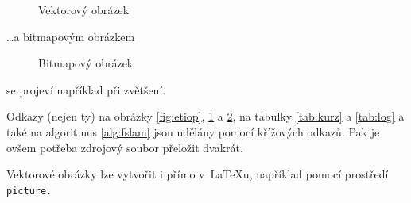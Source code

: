 \documentclass[a4paper, 11pt]{article}
\begin{document}
\begin{figure}[h]
	\centering

	\caption{Vektorový obrázek}
	\label{fig:oniisan}
\end{figure}
\bigskip

\noindent
\dots a bitmapovým obrázkem

\begin{figure}[h]
	\centering

	\caption{Bitmapový obrázek}
	\label{fig:oniisan2}
\end{figure}
\bigskip

\noindent
se projeví například při zvětšení.

Odkazy (nejen ty) na obrázky \ref{fig:etiop}, \ref{fig:oniisan} a
\ref{fig:oniisan2}, na tabulky \ref{tab:kurz} a \ref{tab:log} a také
na algoritmus \ref{alg:fslam} jsou udělány pomocí křížových odkazů. Pak je
ovšem potřeba zdrojový soubor přeložit dvakrát.

Vektorové obrázky lze vytvořit i přímo v~\LaTeX{}u, například pomocí
prostředí\texttt{ picture.}
\pagebreak
\end{document}
